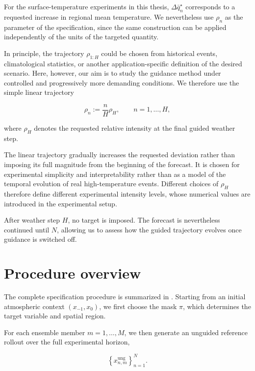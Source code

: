 For the surface-temperature experiments in this thesis,
$\Delta\bar{q}_n^\star$ corresponds to a requested increase in regional mean
temperature. We nevertheless use $\rho_n$ as the parameter of the
specification, since the same construction can be applied independently of the
units of the targeted quantity.

In principle, the trajectory $\rho_{1:H}$ could be chosen from historical
events, climatological statistics, or another application-specific definition
of the desired scenario. Here, however, our aim is to study the guidance method
under controlled and progressively more demanding conditions. We therefore use
the simple linear trajectory

\begin{equation}
    \rho_n
    :=
    \frac{n}{H}\rho_H,
    \qquad
    n=1,\ldots,H,
    \label{eq:relative-target-schedule}
\end{equation}

where $\rho_H$ denotes the requested relative intensity at the final guided
weather step.

The linear trajectory gradually increases the requested deviation rather than
imposing its full magnitude from the beginning of the forecast. It is chosen
for experimental simplicity and interpretability rather than as a model of the
temporal evolution of real high-temperature events. Different choices of
$\rho_H$ therefore define different experimental intensity levels, whose
numerical values are introduced in the experimental setup.

After weather step $H$, no target is imposed. The forecast is nevertheless
continued until $N$, allowing us to assess how the guided trajectory evolves
once guidance is switched off.

\section{Procedure overview}

The complete specification procedure is summarized in
. Starting from an initial atmospheric
context $(x_{-1},x_0)$, we first choose the mask $\pi$, which determines the
target variable and spatial region.

For each ensemble member $m=1,\ldots,M$, we then generate an unguided
reference rollout over the full experimental horizon,

\[
    \left\{
        x_{n,m}^{\mathrm{ung}}
    \right\}_{n=1}^{N}.
\]

